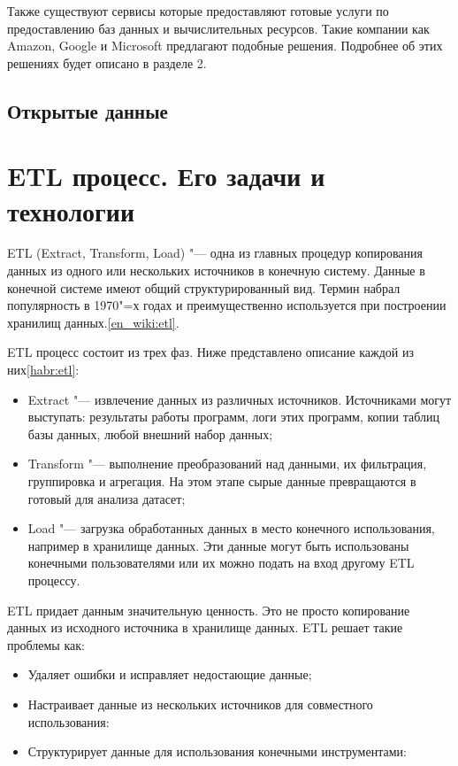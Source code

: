 \documentclass[bachelor, och, pract]{SCWorks}
\begin{document}
Также существуют сервисы которые предоставляют готовые услуги по предоставлению баз данных и вычислительных ресурсов. Такие компании как  Amazon, Google и Microsoft предлагают подобные решения. Подробнее об этих решениях будет описано в разделе 2.

\subsection{Открытые данные}

\newpage

\section{ETL процесс. Его задачи и технологии}
ETL (Extract, Transform, Load) "--- одна из главных процедур копирования данных из одного или нескольких источников в конечную систему. Данные в конечной системе имеют общий структурированный вид. Термин набрал популярность в  1970"=х годах и преимущественно используется при построении хранилищ данных.\ref{en_wiki:etl}.

ETL процесс состоит из трех фаз. Ниже представлено описание каждой из них\ref{habr:etl}:
\begin{itemize}
	\item Extract "--- извлечение данных из различных источников. Источниками могут выступать: результаты работы программ, логи этих программ, копии таблиц базы данных, любой внешний набор данных;
	\item Transform "--- выполнение преобразований над данными, их фильтрация, группировка и агрегация. На этом этапе сырые данные превращаются в готовый для анализа датасет;
	\item Load "--- загрузка обработанных данных в место конечного использования, например в хранилище данных. Эти данные могут быть использованы конечными пользователями или их можно подать на вход другому ETL процессу.
\end{itemize}

ETL придает данным значительную ценность. Это не просто копирование данных из исходного источника в хранилище данных.
ETL решает такие проблемы как:
\begin{itemize}
	\item Удаляет ошибки  и исправляет недостающие данные;
	\item Настраивает данные из нескольких источников для совместного использования:
	\item Структурирует данные для использования конечными инструментами:
\end{itemize}
\end{document}
